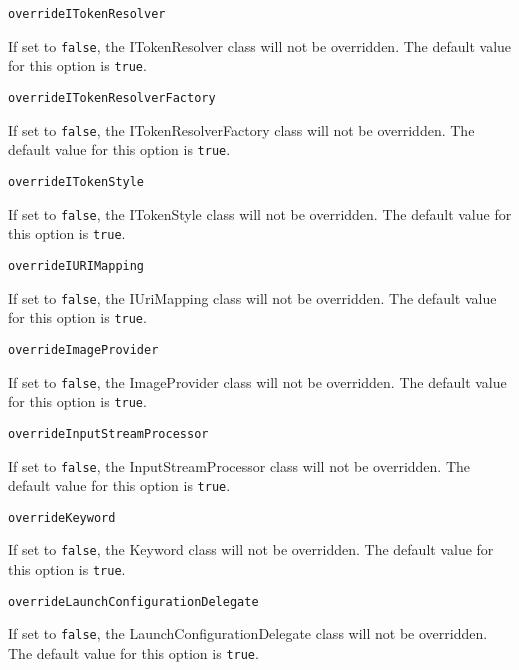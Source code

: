 \noindent\texttt{overrideITokenResolver}
\begin{myindentpar}{1cm}
If set to \texttt{false}, the ITokenResolver class will not be overridden. The default value for this option is \texttt{true}.
\end{myindentpar}

\noindent\texttt{overrideITokenResolverFactory}
\begin{myindentpar}{1cm}
If set to \texttt{false}, the ITokenResolverFactory class will not be overridden. The default value for this option is \texttt{true}.
\end{myindentpar}

\noindent\texttt{overrideITokenStyle}
\begin{myindentpar}{1cm}
If set to \texttt{false}, the ITokenStyle class will not be overridden. The default value for this option is \texttt{true}.
\end{myindentpar}

\noindent\texttt{overrideIURIMapping}
\begin{myindentpar}{1cm}
If set to \texttt{false}, the IUriMapping class will not be overridden. The default value for this option is \texttt{true}.
\end{myindentpar}

\noindent\texttt{overrideImageProvider}
\begin{myindentpar}{1cm}
If set to \texttt{false}, the ImageProvider class will not be overridden. The default value for this option is \texttt{true}.
\end{myindentpar}

\noindent\texttt{overrideInputStreamProcessor}
\begin{myindentpar}{1cm}
If set to \texttt{false}, the InputStreamProcessor class will not be overridden. The default value for this option is \texttt{true}.
\end{myindentpar}

\noindent\texttt{overrideKeyword}
\begin{myindentpar}{1cm}
If set to \texttt{false}, the Keyword class will not be overridden. The default value for this option is \texttt{true}.
\end{myindentpar}

\noindent\texttt{overrideLaunchConfigurationDelegate}
\begin{myindentpar}{1cm}
If set to \texttt{false}, the LaunchConfigurationDelegate class will not be overridden. The default value for this option is \texttt{true}.
\end{myindentpar}


